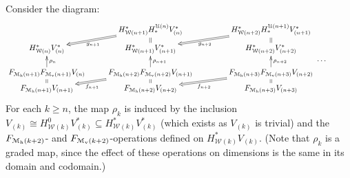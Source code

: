 \documentclass[11pt]{amsart}
\theoremstyle{plain}
\theoremstyle{definition}
\newcommand{\calU}{\mathcal{U}}
\newcommand{\calM}{\mathcal{M}}
\newcommand{\calw}{\mathcal{W}}
\newcommand{\calMv}{\mathcal{M}_\textup{v}}
\newcommand{\calMh}{\mathcal{M}_\textup{h}}
\theoremstyle{plain}
\begin{document}
\begin{Calculations of HWn for n nonzero}
Consider the diagram:
\[\xymatrix@R=1.5mm{
&
H^*_{\calw({n+1})}H_*^{\calU(n)}V^*_{(n)}\ar@{=>}[dl]^-{g_{n+1}}\ar@{=}[d]&
H^*_{\calw({n+2})}H_*^{\calU({n+1})}V^*_{({n+1})}\ar@{=>}[dl]^-{g_{n+2}}\ar@{=}[d]&
\\
 H^*_{\calw(n)}V^*_{(n)}
&H^*_{\calw({n+1})}V^*_{({n+1})}
&H^*_{\calw({n+2})}V^*_{({n+2})}
\\
&&\makebox[5cm][r]{\,$\smash{\cdots }$}
\\
 F_{\calM_{\textup{h}}({n+1})}F_{\calM_{\textup{v}}({n+1})}V_{(n)}\ar[uu]_-{\rho_n}\ar@{=}[d]
&F_{\calM_{\textup{h}}({n+2})}F_{\calM_{\textup{v}}({n+2})}V_{({n+1})}\ar[uu]_-{\rho_{n+1}}\ar@{=}[d]\ar@{=>}[ld]^-{f_{n+1}}
&F_{\calM_{\textup{h}}({n+3})}F_{\calM_{\textup{v}}({n+3})}V_{({n+2})}\ar[uu]_-{\rho_{n+2}}\ar@{=}[d]\ar@{=>}[ld]^-{f_{n+2}}
\\
 F_{\calMh({n+1})}V_{({n+1})}
&F_{\calMh({n+2})}V_{({n+2})}
&F_{\calMh({n+3})}V_{({n+3})}
}\]
For each $k\geq n$, the map $\rho_k$ is induced by the inclusion $V_{(k)}\cong H^{0}_{\calw(k)}V^*_{(k)}\subseteq H^*_{\calw(k)}V^*_{(k)}$ (which exists as $V_{(k)}$ is trivial) and the $F_{\calMh(k+2)}$- and $F_{\calMv(k+2)}$-operations defined on $H^*_{\calw(k)}V_{(k)}$. (Note that $\rho_{k}$ is a graded map, since the effect of these operations on dimensions is the same in its domain and codomain.)


\end{Calculations of HWn for n nonzero}
\end{document}
